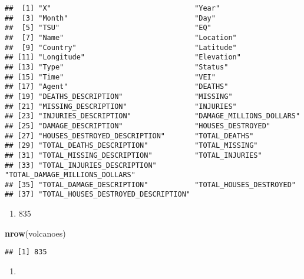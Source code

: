 \documentclass[
]{article}
\newenvironment{Shaded}{\begin{snugshade}}{\end{snugshade}}
\newcommand{\KeywordTok}[1]{\textcolor[rgb]{0.13,0.29,0.53}{\textbf{#1}}}
\newcommand{\NormalTok}[1]{#1}
\providecommand{\tightlist}{%
  \setlength{\itemsep}{0pt}\setlength{\parskip}{0pt}}
\begin{document}
\begin{verbatim}
##  [1] "X"                                  "Year"                              
##  [3] "Month"                              "Day"                               
##  [5] "TSU"                                "EQ"                                
##  [7] "Name"                               "Location"                          
##  [9] "Country"                            "Latitude"                          
## [11] "Longitude"                          "Elevation"                         
## [13] "Type"                               "Status"                            
## [15] "Time"                               "VEI"                               
## [17] "Agent"                              "DEATHS"                            
## [19] "DEATHS_DESCRIPTION"                 "MISSING"                           
## [21] "MISSING_DESCRIPTION"                "INJURIES"                          
## [23] "INJURIES_DESCRIPTION"               "DAMAGE_MILLIONS_DOLLARS"           
## [25] "DAMAGE_DESCRIPTION"                 "HOUSES_DESTROYED"                  
## [27] "HOUSES_DESTROYED_DESCRIPTION"       "TOTAL_DEATHS"                      
## [29] "TOTAL_DEATHS_DESCRIPTION"           "TOTAL_MISSING"                     
## [31] "TOTAL_MISSING_DESCRIPTION"          "TOTAL_INJURIES"                    
## [33] "TOTAL_INJURIES_DESCRIPTION"         "TOTAL_DAMAGE_MILLIONS_DOLLARS"     
## [35] "TOTAL_DAMAGE_DESCRIPTION"           "TOTAL_HOUSES_DESTROYED"            
## [37] "TOTAL_HOUSES_DESTROYED_DESCRIPTION"
\end{verbatim}

\begin{enumerate}
\def\labelenumi{\arabic{enumi}.}
\setcounter{enumi}{2}
\tightlist
\item
  835
\end{enumerate}

\begin{Shaded}
\begin{Highlighting}[]
\KeywordTok{nrow}\NormalTok{(volcanoes)}
\end{Highlighting}
\end{Shaded}

\begin{verbatim}
## [1] 835
\end{verbatim}

\begin{enumerate}
\def\labelenumi{\arabic{enumi}.}
\setcounter{enumi}{3}
\tightlist
\item
\end{enumerate}
\end{document}
